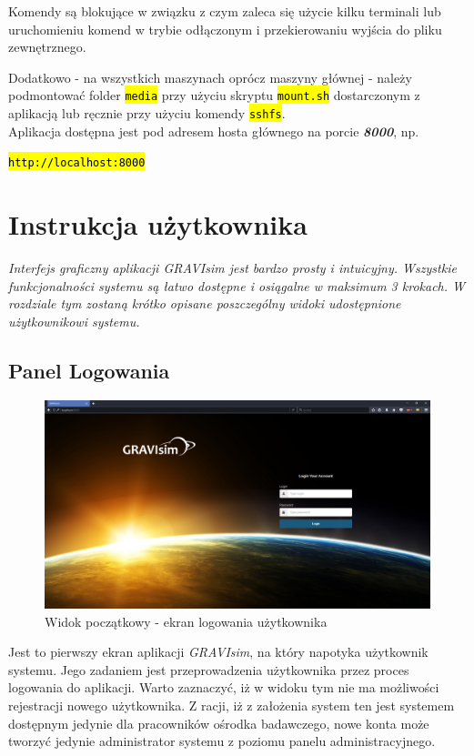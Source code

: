 \documentclass[a4paper,onecolumn,oneside,12pt]{memoir}
\begin{document}
{{Komendy są blokujące w związku z czym zaleca się użycie kilku terminali lub uruchomieniu
komend w trybie odłączonym i przekierowaniu wyjścia do pliku zewnętrznego.\vspace{2mm}

Dodatkowo - na wszystkich maszynach oprócz maszyny głównej - należy podmontować folder
\texttt{\hl{media}} przy użyciu skryptu \texttt{\hl{mount.sh}} dostarczonym z aplikacją lub ręcznie przy użyciu
komendy \texttt{\hl{sshfs}}.\\
\vspace{2mm} Aplikacja dostępna jest pod adresem hosta głównego na porcie \textbf{\textit{8000}}, np.\\
\centerline{\texttt{\hl{http://localhost:8000}}}
\chapter{Instrukcja użytkownika}
\emph{\quad \quad Interfejs graficzny aplikacji GRAVIsim jest bardzo prosty i intuicyjny. Wszystkie funkcjonalności systemu są łatwo dostępne i osiągalne w maksimum 3 krokach. W rozdziale tym zostaną krótko opisane poszczególny widoki udostępnione użytkownikowi systemu.
}
\section{Panel Logowania}
\begin{figure}[h!]
	\centering
	\includegraphics[width=1\linewidth]{pictures/screen-1}
	\caption{Widok początkowy - ekran logowania użytkownika}
\end{figure}
Jest to pierwszy ekran aplikacji \textit{GRAVIsim}, na który napotyka użytkownik systemu. Jego zadaniem jest przeprowadzenia użytkownika przez proces logowania do aplikacji. Warto zaznaczyć, iż w widoku tym nie ma możliwości rejestracji nowego użytkownika. Z racji, iż z założenia system ten jest systemem dostępnym jedynie dla pracowników ośrodka badawczego, nowe konta może tworzyć jedynie administrator systemu z poziomu panelu administracyjnego.
\pagebreak
\vspace*{1mm}
}}
\end{document}
